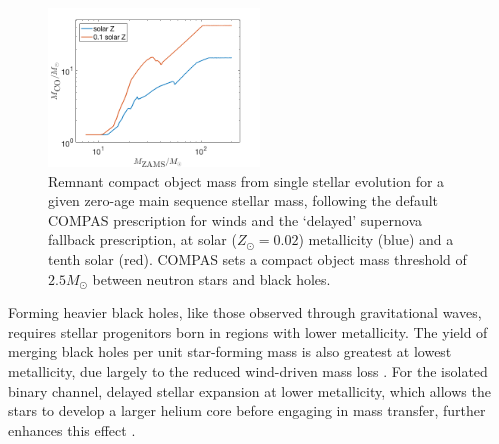 \documentclass[iop,onecolumn]{revtex4}
\begin{document}
\begin{figure}
	\centering
	\includegraphics[width=0.5\textwidth]{BHremnantdelayed.png}
	\caption{\label{fig:BHremnant} Remnant compact object mass from single stellar evolution for a given zero-age main sequence stellar mass, following the default COMPAS prescription for winds \citep{Stevenson:2017}  and the `delayed' \citet{Fryer:2012} supernova fallback prescription, at solar ($Z_\odot=0.02$) metallicity (blue) and a tenth solar (red).  COMPAS sets a compact object mass threshold of $2.5 M_\odot$ between neutron stars and black holes.
	} 
\end{figure}

Forming heavier black holes, like those observed through gravitational waves, requires stellar progenitors born in regions with lower metallicity. The yield of merging black holes per unit star-forming mass is also greatest at lowest metallicity, due largely to the reduced wind-driven mass loss \citep[e.g.,][]{Belczynski:2010,Kruckow:2018}. For the isolated binary channel, delayed stellar expansion at lower metallicity, which allows the stars to develop a larger helium core before engaging in mass transfer, further enhances this effect \citep[e.g.,][]{Stevenson:2017}.
\end{document}
